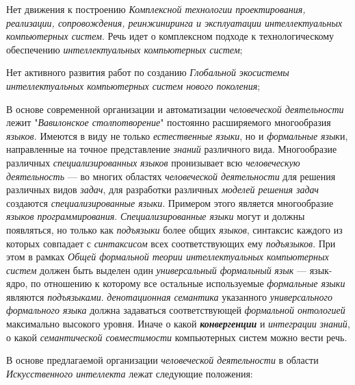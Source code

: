 \begin{textitemize}
	\item
	Нет движения к построению \textit{Комплексной технологии проектирования, реализации, сопровождения, реинжиниринга и эксплуатации интеллектуальных компьютерных систем}. Речь идет о комплексном подходе к технологическому обеспечению   \textit{интеллектуальных компьютерных систем};
	\item
	Нет активного развития работ по созданию \textit{Глобальной} \textit{экосистемы интеллектуальных компьютерных систем нового поколения};
	\item
	В основе современной организации и автоматизации \textit{человеческой деятельности} лежит "\textit{Вавилонское столпотворение}"{} постоянно расширяемого многообразия \textit{языков.} Имеются в виду не только \textit{естественные} \textit{языки}, но и \textit{формальные} \textit{язык}и, направленные на точное представление \textit{знаний} различного вида. Многообразие различных \textit{специализированных} \textit{языков} пронизывает всю \textit{человеческую деятельность} --- во многих областях \textit{человеческой деятельности} для решения различных видов \textit{задач}, для разработки различных \textit{моделей решения задач} создаются \textit{специализированные языки}. Примером этого является многообразие \textit{языков программирования}. \textit{Специализированные языки} могут и должны появляться, но только как \textit{\textit{подъязыки}} более общих \textit{языков}, синтаксис каждого из которых совпадает с \textit{синтаксисом} всех соответствующих ему \textit{подъязыков}. При этом в рамках \textit{Общей формальной теории интеллектуальных компьютерных систем} должен быть выделен один \textit{универсальный формальный} \textit{язык} --- язык-ядро, по отношению к которому все остальные используемые \textit{формальные языки} являются \textit{подъязыками}. \textit{денотационная семантика} указанного \textit{универсального формального языка} должна задаваться соответствующей \textit{формальной онтологией} максимально высокого уровня. Иначе о какой \textbf{\textit{конвергенции}} и \textit{интеграции} \textit{знаний}, о какой \textit{семантической совместимости} компьютерных систем можно вести речь.
\end{textitemize}

В основе предлагаемой организации \textit{человеческой деятельности} в области \textit{Искусственного интеллекта} лежат следующие положения:

